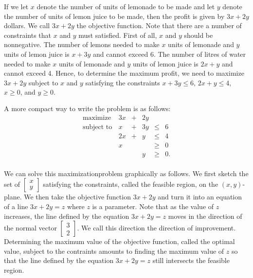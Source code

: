 \documentclass[]{book}
\theoremstyle{definition}
\theoremstyle{definition}
\theoremstyle{remark}
\begin{document}
If we let \(x\) denote the number of units of lemonade to be made and
let \(y\) denote the number of units of lemon juice to be made, then the
profit is given by \(3x + 2y\) dollars. We call \(3x + 2y\) the
objective function. Note that there are a number of constraints that
\(x\) and \(y\) must satisfied. First of all, \(x\) and \(y\) should be
nonnegative. The number of lemons needed to make \(x\) units of lemonade
and \(y\) units of lemon juice is \(x+3y\) and cannot exceed 6. The
number of litres of water needed to make \(x\) units of lemonade and
\(y\) units of lemon juice is \(2x+y\) and cannot exceed 4. Hence, to
determine the maximum profit, we need to maximize \(3x + 2y\) subject to
\(x\) and \(y\) satisfying the constraints \(x + 3y \leq 6\),
\(2x + y \leq 4\), \(x \geq 0\), and \(y \geq 0.\)

A more compact way to write the problem is as follows:
\[\begin{array}{rrcrll}
\mbox{maximize } & 3x & + & 2y & \\
\mbox{subject to} 
& x & + & 3y & \leq & 6 \\
& 2x & +&  y & \leq & 4 \\
& x &  & & \geq & 0 \\
& & & y & \geq & 0. \\
\end{array}\]

We can solve this maximizationproblem graphically as follows. We first
sketch the set of \(\begin{bmatrix} x\\ y\end{bmatrix}\) satisfying the
constraints, called the feasible region, on the \((x,y)\)-plane. We then
take the objective function \(3x+2y\) and turn it into an equation of a
line \(3x+2y = z\) where \(z\) is a parameter. Note that as the value of
\(z\) increases, the line defined by the equation \(3x+2y=z\) moves in
the direction of the normal vector
\(\begin{bmatrix} 3 \\ 2\end{bmatrix}\). We call this direction the
direction of improvement. Determining the maximum value of the objective
function, called the optimal value, subject to the contraints amounts to
finding the maximum value of \(z\) so that the line defined by the
equation \(3x+2y=z\) still intersects the feasible region.
\end{document}
